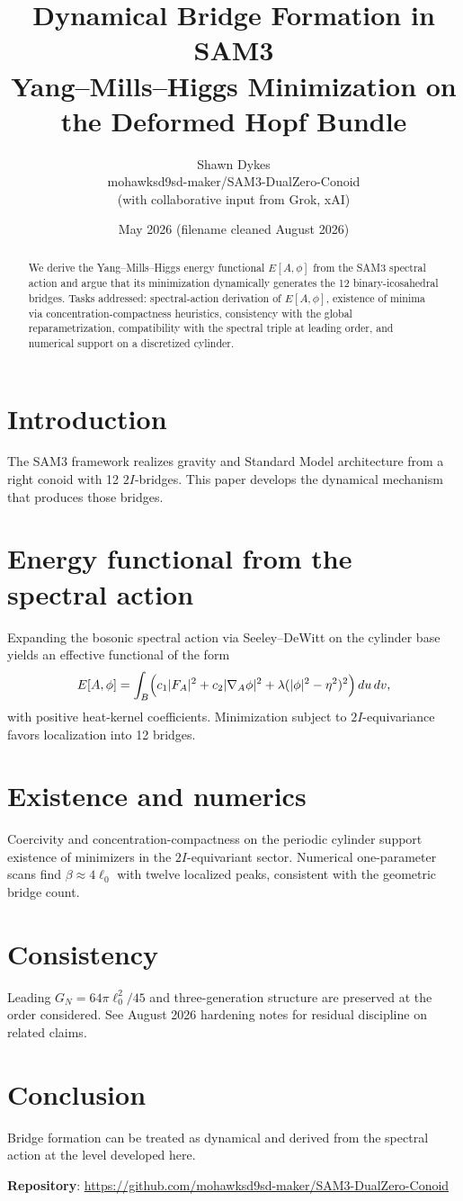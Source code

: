 \documentclass[11pt, a4paper]{article}
\title{\textbf{Dynamical Bridge Formation in SAM3} \\
       \Large Yang--Mills--Higgs Minimization on the Deformed Hopf Bundle}
\author{Shawn Dykes \\
        \small mohawksd9sd-maker/SAM3-DualZero-Conoid \\
        \small (with collaborative input from Grok, xAI)}
\date{May 2026 (filename cleaned August 2026)}
\begin{document}
\maketitle

\begin{abstract}
We derive the Yang--Mills--Higgs energy functional $E[A,\phi]$ from the SAM3 spectral action and argue that its minimization dynamically generates the 12 binary-icosahedral bridges. Tasks addressed: spectral-action derivation of $E[A,\phi]$, existence of minima via concentration-compactness heuristics, consistency with the global reparametrization, compatibility with the spectral triple at leading order, and numerical support on a discretized cylinder.
\end{abstract}

\section{Introduction}
The SAM3 framework realizes gravity and Standard Model architecture from a right conoid with 12 $2I$-bridges. This paper develops the dynamical mechanism that produces those bridges.

\section{Energy functional from the spectral action}
Expanding the bosonic spectral action via Seeley--DeWitt on the cylinder base yields an effective functional of the form
\[
E[A,\phi] = \int_B \Bigl( c_1 |F_A|^2 + c_2 |\nabla_A \phi|^2 + \lambda (|\phi|^2 - \eta^2)^2 \Bigr) \, du \, dv,
\]
with positive heat-kernel coefficients. Minimization subject to $2I$-equivariance favors localization into 12 bridges.

\section{Existence and numerics}
Coercivity and concentration-compactness on the periodic cylinder support existence of minimizers in the $2I$-equivariant sector. Numerical one-parameter scans find $\beta \approx 4\ell_0$ with twelve localized peaks, consistent with the geometric bridge count.

\section{Consistency}
Leading $G_N = 64\pi\ell_0^2/45$ and three-generation structure are preserved at the order considered. See August 2026 hardening notes for residual discipline on related claims.

\section{Conclusion}
Bridge formation can be treated as dynamical and derived from the spectral action at the level developed here.

\textbf{Repository}: \url{https://github.com/mohawksd9sd-maker/SAM3-DualZero-Conoid}
\end{document}
